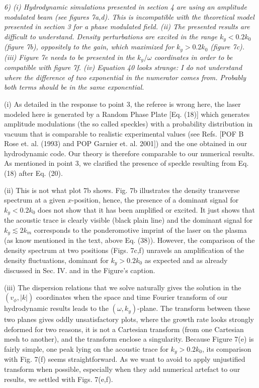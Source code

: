 \documentclass{article}
\begin{document}
\textit{
6) (i) Hydrodynamic simulations presented in section 4 are using an amplitude modulated beam (see figures 7a,d). This is incompatible with the theoretical model presented in section 3 for a phase modulated field. 
(ii) The presented results are difficult to understand. Density perturbations are excited in the range $k_y < 0.2 k_0$ (figure 7b), oppositely to the gain, which maximized for $k_y > 0.2 k_0$ (figure 7c). 
(iii) Figure 7e needs to be presented in the $k_y/\omega$ coordinates in order to be compatible with figure 7f. 
(iv) Equation 40 looks strange: I do not understand where the difference of two exponential in the numerator comes from. Probably both terms should be in the same exponential. }

(i) As detailed in the response to point 3,  the referee is wrong here, the laser modeled here is generated by a Random Phase Plate [Eq. (18)] which generates amplitude modulations (the so called speckles) with a probability distribution in vacuum that is comparable to realistic experimental values (see Refs. [POF B Rose et. al. (1993) and POP Garnier et. al. 2001]) and the one obtained in our hydrodynamic code. Our theory is therefore comparable to our numerical results. As mentioned in point 3, we clarified the presence of speckle resulting from  Eq.  (18)  after Eq. (20).

(ii) This is not what plot 7b shows.  Fig. 7b illustrates the density transverse spectrum at a given $x$-position, hence, the presence of a dominant signal for $k_y < 0.2 k_0$ does not show that it has been amplified or excited. It just shows that the acoustic trace is clearly visible (black plain line) and the dominant signal for $k_y\lesssim 2k_m$ corresponds to the ponderomotive imprint of the laser on the plasma (as know mentioned in the text, above Eq. (38)).
However, the comparison of the density spectrum at two positions (Figs. 7c,f) unravels an amplification of the density fluctuations, dominant for  $k_y > 0.2 k_0$ as expected and as already discussed in Sec. IV. and in the Figure's caption. 

(iii) The dispersion relations that we solve naturally gives the solution in  the $(v_\phi,\vert k \vert)$ coordinates when the space and time Fourier transform of  our hydrodynamic results  leads to the $(\omega,k_y)$-plane. The transform between these two planes gives oddly unsatisfactory plots, where the growth rate looks strongly deformed for two reasons, it is not a Cartesian transform (from one Cartesian mesh to another), and the transform enclose a singularity. Because Figure 7(e) is fairly simple, one peak lying on the acoustic trace for $k_y>0.2k_0$, its comparison with Fig. 7(f) seems straightforward.
As we want to avoid to apply  unjustified transform when possible, especially when they add numerical artefact to our results, we settled with Figs. 7(e,f).
\end{document}

